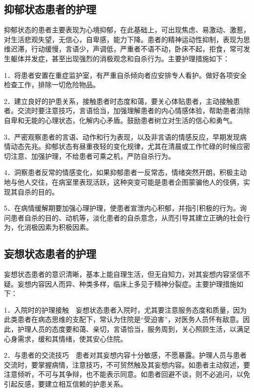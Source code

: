 \subsection{抑郁状态患者的护理}

抑郁状态的患者主要表现为心境抑郁，在此基础上，可出现焦虑、易激动、激惹，对生活悲观失望，无信心，自卑感，能力下降。患者的精神运动性抑制，表现为思维迟滞，行动缓慢，言语少，声调低，严重者不语不动，卧床不起，拒食，常可发生躯体并发症，甚至出现强烈的消极观念和自杀行为。主要护理措施如下：

1．将患者安置在重症监护室，有严重自杀倾向者应安排专人看护。做好各项安全检查工作，排除一切危险物品。

2．建立良好的护患关系，接触患者时态度和蔼，要关心体贴患者，主动接触患者。交流时要注意技巧，言语恰当，加强理解患者的内心情感体验，帮助患者消除自卑和无能的心理状态，化解内心矛盾。鼓励患者树立对生活的信心和勇气。

3．严密观察患者的言语、动作和行为表现，以及非言语的情感反应，早期发现病情动态先兆。抑郁状态有昼重夜轻的变化规律，尤其在清晨或工作忙碌的时候应密切注意、加强护理，不给患者可乘之机，严防自杀行为。

4．洞察患者反常的情感变化，如果抑郁患者一反常态，情绪突然开朗，积极主动地与他人交往，在病室里表现活跃，这种突变可能是患者企图蒙骗他人的伎俩，实现其自杀的目的。

5．在病情缓解期要加强心理护理，使患者宣泄内心积郁，并指引积极的行为。询问患者自杀的目的、动机等，淡化患者的自杀意念，从而引导其建立正确的社会行为，化消极因素为积极因素。

\subsection{妄想状态患者的护理}

妄想状态患者的意识清晰，基本上能自理生活，但无自知力，对其妄想内容坚信不疑。妄想内容因人而异、种类多样，临床上多见于精神分裂症。主要护理措施如下：

1．入院时的护理接触　妄想状态患者入院时，尤其要注意服务态度和质量，因为此类患者在病态思维的支配下，常认为住院是“受迫害”，对医务人员怀有敌意。因此，护理人员的态度要和蔼、亲切，言语恰当，服务周到，关心照顾生活，以满足心身需求，缓和其情绪，使其安心住院。

2．与患者的交流技巧　患者对其妄想内容十分敏感，不愿暴露。护理人员与患者交流时，要掌握病情，注意技巧，不可贸然触及其妄想内容。如患者主动叙述，要注意倾听，不可与其争辩，也不能表示同意。如患者回避不谈，则不必追问，以免引起反感，要建立相互信赖的护患关系。

